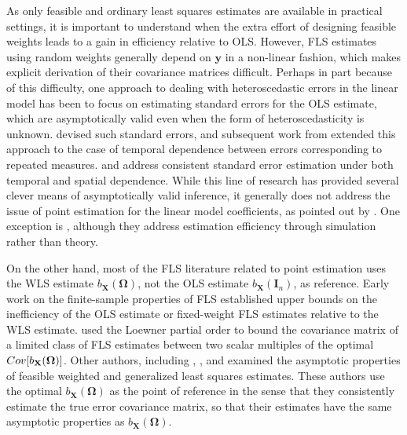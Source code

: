 \documentclass[12pt]{article}
\newcommand{\Cov}[1]{{\rm{Cov}}[ #1 ]}
\newcommand{\bl}[1]{{\mathbf #1}}
\newcommand{\bs}[1]{\boldsymbol #1}
\begin{document}
{As only feasible and ordinary least squares estimates are available in practical settings, it is important to understand when the extra effort of designing feasible weights leads to a gain in efficiency relative to OLS. However, FLS estimates using random weights generally depend on $\bl{y}$ in a non-linear fashion, which makes explicit derivation of their covariance matrices difficult. Perhaps in part because of this difficulty, one approach to dealing with heteroscedastic errors in the linear model has been to focus on estimating standard errors for the OLS estimate, which are asymptotically valid even when the form of heteroscedasticity is unknown. \cite{white_heteroskedasticity-consistent_1980} devised such standard errors, and subsequent work from \cite{arellano_computing_1987} extended this approach to the case of temporal dependence between errors corresponding to repeated measures. \cite{driscoll_consistent_1998} and \cite{vogelsang_heteroskedasticity_2012} address consistent standard error estimation under both temporal and spatial dependence. While this line of research has provided several clever means of asymptotically valid inference, it generally does not address the issue of point estimation for the linear model coefficients, as pointed out by \cite{romano_resurrecting_2017}. One exception is \cite{liang_longitudinal_1986}, although they address estimation efficiency through simulation rather than theory.}

{On the other hand, most of the FLS literature related to point estimation uses the WLS estimate $b_{\bl{X}}(\bs{\Omega})$, not the OLS estimate $b_{\bl{X}}(\bl{I}_n)$, as reference. Early work on the finite-sample properties of FLS established upper bounds on the inefficiency of the OLS estimate \citep{anderson_theory_1948, watson_linear_1967, watson_prediction_1972, knott_minimum_1975} or fixed-weight FLS estimates \citep{khatri_extensions_1981, wang_kantorovich-type_1989} relative to the WLS estimate. \cite{kurata_least_1996} used the Loewner partial order to bound the covariance matrix of a limited class of FLS estimates between two scalar multiples of the optimal $\Cov{b_{\bl{X}}(\bs{\Omega})}$. Other authors, including \cite{fuller_estimation_1978}, \cite{carroll_transformation_1988}, and \cite{hansen_asymptotic_2007} examined the asymptotic properties of feasible weighted and generalized least squares estimates. These authors use the optimal $b_{\bl{X}}(\bs{\Omega})$ as the point of reference in the sense that they consistently estimate the true error covariance matrix, so that their estimates have the same asymptotic properties as $b_{\bl{X}}(\bs{\Omega})$.}
\end{document}
